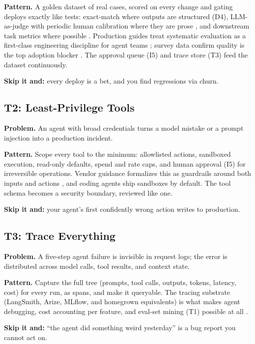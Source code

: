 \documentclass[11pt]{article}
\begin{document}
\textbf{Pattern.} A golden dataset of real cases, scored on every change and
gating deploys exactly like tests: exact-match where outputs are structured
(D4), LLM-as-judge with periodic human calibration where they are prose
\citep{zheng2023judge}, and downstream task metrics where possible
\citep{kapoor2024agentsmatter}. Production guides treat systematic evaluation
as a first-class engineering discipline for agent teams
\citep{mlflow2026production}; survey data confirm quality is the
top adoption blocker \citep{langchain2024state}. The approval queue (I5) and
trace store (T3) feed the dataset continuously.

\textbf{Skip it and:} every deploy is a bet, and you find regressions via
churn.

\subsection{T2: Least-Privilege Tools}

\textbf{Problem.} An agent with broad credentials turns a model mistake or a
prompt injection into a production incident.

\textbf{Pattern.} Scope every tool to the minimum: allowlisted actions,
sandboxed execution, read-only defaults, spend and rate caps, and
human approval (I5) for irreversible operations. Vendor guidance formalizes
this as guardrails around both inputs and actions \citep{openai2025agentsguide},
and coding agents ship sandboxes by default. The tool schema becomes a
security boundary, reviewed like one.

\textbf{Skip it and:} your agent's first confidently wrong action writes to
production.

\subsection{T3: Trace Everything}

\textbf{Problem.} A five-step agent failure is invisible in request logs; the
error is distributed across model calls, tool results, and context state.

\textbf{Pattern.} Capture the full tree (prompts, tool calls, outputs, tokens,
latency, cost) for every run, as spans, and make it queryable. The tracing
substrate (LangSmith, Arize, MLflow, and homegrown equivalents) is what makes
agent debugging, cost accounting per feature, and eval-set mining
(T1) possible at all \citep{arize2026patterns, mlflow2026production}.

\textbf{Skip it and:} ``the agent did something weird yesterday'' is a bug
report you cannot act on.
\end{document}
